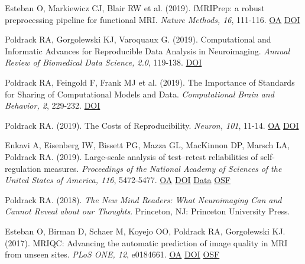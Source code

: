 \documentclass[10pt, letterpaper]{article}
\begin{document}
Esteban O, Markiewicz CJ, Blair RW et al. (2019). fMRIPrep: a robust preprocessing pipeline for functional MRI. \textit{Nature Methods, 16}, 111-116. \href{https://www.ncbi.nlm.nih.gov/pmc/articles/PMC6319393}{OA} \href{https://doi.org/10.1038/s41592-018-0235-4}{DOI} \vspace{2mm}

Poldrack RA, Gorgolewski KJ, Varoquaux G.  (2019). Computational and Informatic Advances for Reproducible Data Analysis in Neuroimaging. \textit{Annual Review of Biomedical Data Science, 2.0}, 119-138. \href{https://doi.org/10.1146/annurev-biodatasci-072018-021237}{DOI} \vspace{2mm}

Poldrack RA, Feingold F, Frank MJ et al. (2019). The Importance of Standards for Sharing of Computational Models and Data. \textit{Computational Brain and Behavior, 2}, 229-232. \href{https://doi.org/10.1007/s42113-019-00062-x}{DOI} \vspace{2mm}

Poldrack RA.  (2019). The Costs of Reproducibility. \textit{Neuron, 101}, 11-14. \href{https://doi.org/10.1016/j.neuron.2018.11.030}{OA} \href{https://doi.org/10.1016/j.neuron.2018.11.030}{DOI} \vspace{2mm}

Enkavi A, Eisenberg IW, Bissett PG, Mazza GL, MacKinnon DP, Marsch LA, Poldrack RA.  (2019). Large-scale analysis of test–retest reliabilities of self-regulation measures. \textit{Proceedings of the National Academy of Sciences of the United States of America, 116}, 5472-5477. \href{https://www.ncbi.nlm.nih.gov/pmc/articles/PMC6431228}{OA} \href{https://doi.org/10.1073/pnas.1818430116}{DOI} \href{https://github.com/IanEisenberg/Self_Regulation_Ontology/tree/master/Data}{Data} \href{https://osf.io/5mjns/}{OSF} \vspace{2mm}

Poldrack RA.  (2018).  \textit{The New Mind Readers: What Neuroimaging Can and Cannot Reveal about our Thoughts}. Princeton, NJ: Princeton University Press.\vspace{2mm}

Esteban O, Birman D, Schaer M, Koyejo OO, Poldrack RA, Gorgolewski KJ.  (2017). MRIQC: Advancing the automatic prediction of image quality in MRI from unseen sites. \textit{PLoS ONE, 12}, e0184661. \href{https://www.ncbi.nlm.nih.gov/pmc/articles/PMC5612458}{OA} \href{https://doi.org/10.1371/journal.pone.0184661}{DOI} \href{https://osf.io/haf97/}{OSF} \vspace{2mm}
\end{document}
